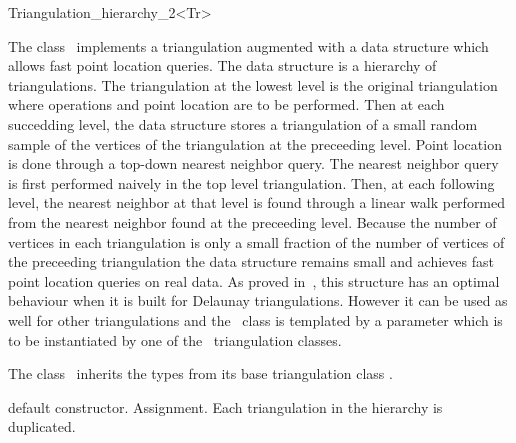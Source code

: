 

\begin{ccRefClass}{Triangulation_hierarchy_2<Tr>}

\ccDefinition
The class \ccRefName\ implements a triangulation augmented with
a data structure which allows fast point location queries.
The data structure is a hierarchy 
of triangulations. The triangulation at the lowest level is
the original triangulation where operations and point location are to 
be performed.
Then at each succedding level, the data structure
stores a triangulation of a small random sample of the vertices
of the triangulation at the preceeding level. Point location
is done through a top-down nearest neighbor query.
The nearest neighbor query is first
performed naively in the top level triangulation.
Then, at each following level, the nearest neighbor at that level
is found through a linear walk performed from
the nearest neighbor found at the preceeding level.
Because the number of vertices in each triangulation is only a small
fraction of the number of vertices of the preceeding triangulation 
the data structure remains small and achieves fast point location 
queries on real
data. As proved in~\cite{d-iirdt-98}, this structure has an optimal behaviour
when it is built for Delaunay triangulations.
However it can be used as well for other triangulations
and the \ccRefName\ class is templated by a parameter
which is to be instantiated by one of the \cgal\ triangulation
classes.


\ccInheritsFrom


\ccTypes
The class \ccRefName\ inherits the types from its base triangulation
class . 

\ccCreation
{}  %

{default constructor.}
\ccGlue
{}
\ccGlue
{}
{Assignment. Each triangulation in the hierarchy is duplicated.}


\end{ccRefClass}
